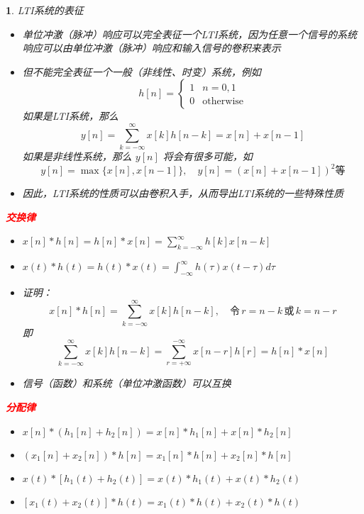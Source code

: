 \documentclass[UTF8]{report}
\theoremstyle{MyLineTheoremStyle} %
\theoremstyle{MyBlockTheoremStyle} %
\theoremstyle{MySubsubsectionStyle} %
\newtheorem{definition}{}
\begin{document}
\begin{definition}
    LTI系统的表征
    \begin{itemize}
        \item 单位冲激（脉冲）响应可以完全表征一个LTI系统，因为任意一个信号的系统响应可以由单位冲激（脉冲）响应和输入信号的卷积来表示
        \item 但不能完全表征一个一般（非线性、时变）系统，例如
        \[
        h[n] = \begin{cases} 
        1 & n = 0, 1 \\
        0 & \text{otherwise} 
        \end{cases}
        \]
        如果是LTI系统，那么
        \[
        y[n] = \sum_{k=-\infty}^{\infty} x[k] h[n - k] = x[n] + x[n - 1]
        \]
        如果是非线性系统，那么 $y[n]$ 将会有很多可能，如
        \[
        y[n] = \max\{x[n], x[n - 1]\}, \quad y[n] = (x[n] + x[n - 1])^2 \text{等}
        \]
        \item 因此，LTI系统的性质可以由卷积入手，从而导出LTI系统的一些特殊性质
    \end{itemize}
\vspace{1em}
    \textbf{\textcolor{red}{交换律}}
    \begin{itemize}
        \item $x[n] * h[n] = h[n] * x[n] = \sum_{k=-\infty}^{\infty} h[k] x[n - k]$
        \item $x(t) * h(t) = h(t) * x(t) = \int_{-\infty}^{\infty} h(\tau) x(t - \tau) d\tau$
        \item 证明：
        \[
        x[n] * h[n] = \sum_{k=-\infty}^{\infty} x[k] h[n - k], \quad \text{令} \, r = n - k \, \text{或} \, k = n - r
        \]
        即
        \[
        \sum_{k=-\infty}^{\infty} x[k] h[n - k] = \sum_{r=+\infty}^{-\infty} x[n - r] h[r] = h[n] * x[n]
        \]
        \item 信号（函数）和系统（单位冲激函数）可以互换
    \end{itemize}
\vspace{1em}
    \textbf{\textcolor{red}{分配律}}
    \begin{itemize}
        \item $x[n] * (h_1[n] + h_2[n]) = x[n] * h_1[n] + x[n] * h_2[n]$
        \item $(x_1[n] + x_2[n]) * h[n] = x_1[n] * h[n] + x_2[n] * h[n]$
        \item $x(t) * [h_1(t) + h_2(t)] = x(t) * h_1(t) + x(t) * h_2(t)$
        \item $[x_1(t) + x_2(t)] * h(t) = x_1(t) * h(t) + x_2(t) * h(t)$

\end{itemize}
\end{definition}
\end{document}

